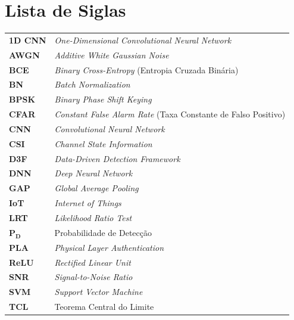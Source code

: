 \documentclass{sbrt}
\begin{document}
\section*{Lista de Siglas}
{\small
\begin{tabular}{@{}p{1.9cm}p{5.9cm}@{}}
\textbf{1D CNN}    & \textit{One-Dimensional Convolutional Neural Network} \\
\textbf{AWGN}      & \textit{Additive White Gaussian Noise} \\
\textbf{BCE}       & \textit{Binary Cross-Entropy} (Entropia Cruzada Binária) \\
\textbf{BN}        & \textit{Batch Normalization} \\
\textbf{BPSK}      & \textit{Binary Phase Shift Keying} \\
\textbf{CFAR}      & \textit{Constant False Alarm Rate} (Taxa Constante de Falso Positivo) \\
\textbf{CNN}       & \textit{Convolutional Neural Network} \\
\textbf{CSI}       & \textit{Channel State Information} \\
\textbf{D3F}       & \textit{Data-Driven Detection Framework}~\cite{ref_braca} \\
\textbf{DNN}       & \textit{Deep Neural Network} \\
\textbf{GAP}       & \textit{Global Average Pooling} \\
\textbf{IoT}       & \textit{Internet of Things} \\
\textbf{LRT}       & \textit{Likelihood Ratio Test} \\
$\boldsymbol{P_D}$ & Probabilidade de Detecção \\
\textbf{PLA}       & \textit{Physical Layer Authentication} \\
\textbf{ReLU}      & \textit{Rectified Linear Unit} \\
\textbf{SNR}       & \textit{Signal-to-Noise Ratio} \\
\textbf{SVM}       & \textit{Support Vector Machine} \\
\textbf{TCL}       & Teorema Central do Limite \\
\end{tabular}
}
\end{document}
